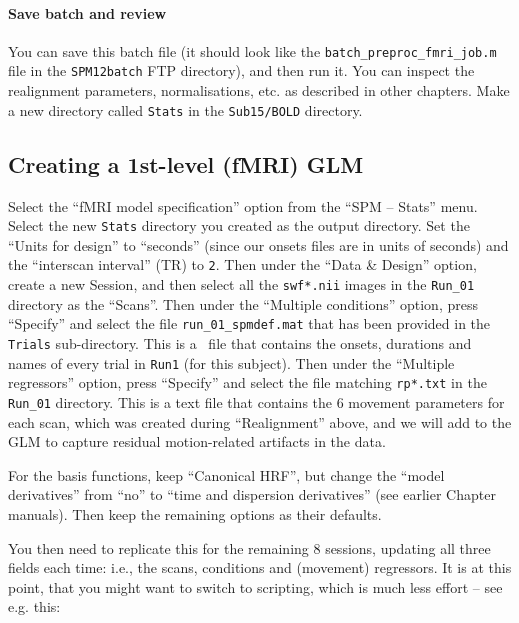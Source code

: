 \paragraph{Save batch and review}

You can save this batch file (it should look like the \texttt{batch\_preproc\_fmri\_job.m} file in the \texttt{SPM12batch} FTP directory), and then run it. You can inspect the realignment parameters, normalisations, etc. as described in other chapters. Make a new directory called \texttt{Stats} in the \texttt{Sub15/BOLD} directory.

\subsection{Creating a 1st-level (fMRI) GLM}

Select the ``fMRI model specification'' option from the ``SPM -- Stats'' menu. Select the new \texttt{Stats} directory you created as the output directory. Set the ``Units for design'' to ``seconds'' (since our onsets files are in units of seconds) and the ``interscan interval'' (TR) to \texttt{2}. Then under the ``Data \& Design'' option, create a new Session, and then select all the \texttt{swf*.nii} images in the \texttt{Run\_01} directory as the ``Scans''. Then under the ``Multiple conditions'' option, press ``Specify'' and select the file \texttt{run\_01\_spmdef.mat} that has been provided in the \texttt{Trials} sub-directory. This is a \matlab\ file that contains the onsets, durations and names of every trial in \texttt{Run1} (for this subject). Then under the ``Multiple regressors'' option, press ``Specify'' and select the file matching \texttt{rp*.txt} in the \texttt{Run\_01} directory. This is a text file that contains the 6 movement parameters for each scan, which was created during ``Realignment'' above, and we will add to the GLM to capture residual motion-related artifacts in the data.

For the basis functions, keep ``Canonical HRF'', but change the ``model derivatives'' from ``no'' to ``time and dispersion derivatives'' (see earlier Chapter manuals). Then keep the remaining options as their defaults.

You then need to replicate this for the remaining 8 sessions, updating all three fields each time: i.e., the scans, conditions and (movement) regressors. It is at this point, that you might want to switch to scripting, which is much less effort -- see e.g. this:

